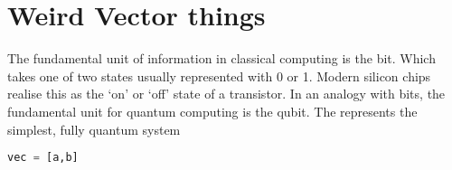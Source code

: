 \section{Weird Vector things}\label{TheBasics}
The fundamental unit of information in classical computing is the bit. Which takes one of two states usually represented with 0 or 1. Modern silicon chips realise this as the `on' or `off' state of a transistor. In an analogy with bits, the fundamental unit for quantum computing is the qubit. The represents the simplest, fully quantum system 

\begin{lstlisting}[language=Python]
vec = [a,b]
\end{lstlisting}
